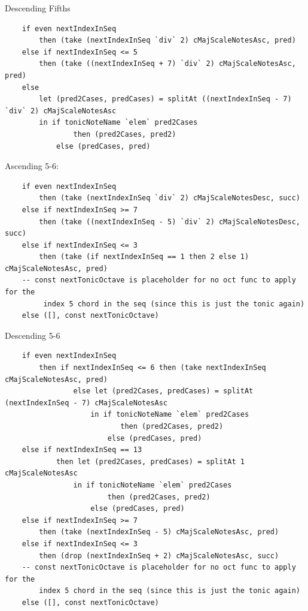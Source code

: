 \documentclass{report}
\begin{document}
Descending  Fifths
\begin{verbatim}
    if even nextIndexInSeq 
        then (take (nextIndexInSeq `div` 2) cMajScaleNotesAsc, pred)
    else if nextIndexInSeq <= 5
        then (take ((nextIndexInSeq + 7) `div` 2) cMajScaleNotesAsc, pred)
    else 
        let (pred2Cases, predCases) = splitAt ((nextIndexInSeq - 7) `div` 2) cMajScaleNotesAsc
        in if tonicNoteName `elem` pred2Cases 
                then (pred2Cases, pred2) 
            else (predCases, pred)
\end{verbatim}

Ascending 5-6:
\begin{verbatim}
    if even nextIndexInSeq 
        then (take (nextIndexInSeq `div` 2) cMajScaleNotesDesc, succ)
    else if nextIndexInSeq >= 7  
        then (take ((nextIndexInSeq - 5) `div` 2) cMajScaleNotesDesc, succ)
    else if nextIndexInSeq <= 3 
        then (take (if nextIndexInSeq == 1 then 2 else 1) cMajScaleNotesAsc, pred)
    -- const nextTonicOctave is placeholder for no oct func to apply for the 
         index 5 chord in the seq (since this is just the tonic again)
    else ([], const nextTonicOctave)  
\end{verbatim}

Descending 5-6
\begin{verbatim}
    if even nextIndexInSeq 
        then if nextIndexInSeq <= 6 then (take nextIndexInSeq cMajScaleNotesAsc, pred)
                else let (pred2Cases, predCases) = splitAt (nextIndexInSeq - 7) cMajScaleNotesAsc
                    in if tonicNoteName `elem` pred2Cases 
                           then (pred2Cases, pred2) 
                        else (predCases, pred)
    else if nextIndexInSeq == 13
            then let (pred2Cases, predCases) = splitAt 1 cMajScaleNotesAsc
                in if tonicNoteName `elem` pred2Cases 
                        then (pred2Cases, pred2)
                    else (predCases, pred)
    else if nextIndexInSeq >= 7
        then (take (nextIndexInSeq - 5) cMajScaleNotesAsc, pred)
    else if nextIndexInSeq <= 3
        then (drop (nextIndexInSeq + 2) cMajScaleNotesAsc, succ)
    -- const nextTonicOctave is placeholder for no oct func to apply for the 
        index 5 chord in the seq (since this is just the tonic again)
    else ([], const nextTonicOctave) 
\end{verbatim}
\end{document}
